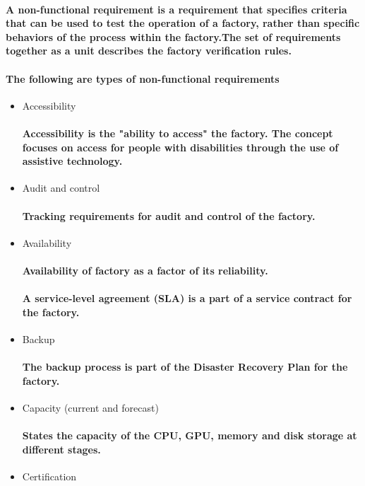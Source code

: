 \documentclass{acm_proc_article-sp}
\begin{document}
\paragraph{A non-functional requirement is a requirement that specifies criteria that can be used to test the operation of a factory, rather than specific behaviors of the process within the factory.The set of requirements together as a unit describes the factory verification rules.}
\paragraph{The following are types of non-functional requirements}
\begin{itemize} 
\item Accessibility
\paragraph{Accessibility is the "ability to access" the factory. The concept focuses on access for people with disabilities through the use of assistive technology.}
\item Audit and control
\paragraph{Tracking requirements for audit and control of the factory.}
\item Availability
\paragraph{Availability of factory as a factor of its reliability.}
\paragraph{A service-level agreement (SLA) is a part of a service contract for the factory.}
\item Backup
\paragraph{The backup process is part of the Disaster Recovery Plan for the factory.}
\item Capacity (current and forecast)
\paragraph{States the capacity of the CPU, GPU, memory and disk storage at different stages.}
\item Certification

\end{itemize}
\end{document}
